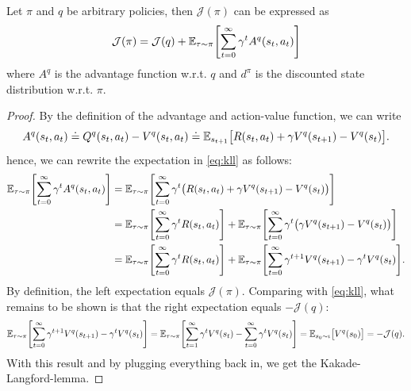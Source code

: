 		\begin{theorem}  \label{th:kll}
			Let \(\pi\) and \(q\) be arbitrary policies, then \(\mathcal{J}(\pi)\) can be expressed as
			\begin{equation}
				\mathcal{J}(\pi) = \mathcal{J}(q) + \mathbb{E}_{\tau \sim \pi}\Biggl[ \sum_{t = 0}^{\infty} \gamma^t A^q(s_t, a_t) \Biggr]  \label{eq:kll}
			\end{equation}
			where \( A^q \) is the advantage function w.r.t. \(q\) and \(d^\pi\) is the discounted state distribution w.r.t. \(\pi\).
		\end{theorem}
		\begin{proof}
			By the definition of the advantage and action-value function, we can write
			\begin{equation}
				A^q(s_t, a_t)
					\doteq Q^q(s_t, a_t) - V^q(s_t, a_t)
					\doteq \mathbb{E}_{s_{t + 1}}\bigl[ R(s_t, a_t) + \gamma V^q(s_{t + 1}) - V^q(s_t) \bigr].
			\end{equation}
			hence, we can rewrite the expectation in \eqref{eq:kll} as follows:
			\begin{align}
				\mathbb{E}_{\tau \sim \pi}\Biggl[ \sum_{t = 0}^{\infty} \gamma^t A^q(s_t, a_t) \Biggr]
					&= \mathbb{E}_{\tau \sim \pi}\Biggl[ \sum_{t = 0}^{\infty} \gamma^t \bigl( R(s_t, a_t) + \gamma V^q(s_{t + 1}) - V^q(s_t) \bigr) \Biggr] \\
					&= \mathbb{E}_{\tau \sim \pi}\Biggl[ \sum_{t = 0}^{\infty} \gamma^t R(s_t, a_t) \Biggr] + \mathbb{E}_{\tau \sim \pi}\Biggl[ \sum_{t = 0}^{\infty} \gamma^t \bigl( \gamma V^q(s_{t + 1}) - V^q(s_t) \bigr) \Biggr] \\
					&= \mathbb{E}_{\tau \sim \pi}\Biggl[ \sum_{t = 0}^{\infty} \gamma^t R(s_t, a_t) \Biggr] + \mathbb{E}_{\tau \sim \pi}\Biggl[ \sum_{t = 0}^{\infty} \gamma^{t + 1} V^q(s_{t + 1}) - \gamma^t V^q(s_t) \Biggr].
			\end{align}
			By definition, the left expectation equals \( \mathcal{J}(\pi) \). Comparing with \eqref{eq:kll}, what remains to be shown is that the right expectation equals \( -\mathcal{J}(q) \):
			\begin{equation}
				\mathbb{E}_{\tau \sim \pi}\Biggl[ \sum_{t = 0}^{\infty} \gamma^{t + 1} V^q(s_{t + 1}) - \gamma^t V^q(s_t) \Biggr]
					= \mathbb{E}_{\tau \sim \pi}\Biggl[ \sum_{t = 1}^{\infty} \gamma^t V^q(s_t) - \sum_{t = 0}^{\infty} \gamma^t V^q(s_t) \Biggr]
					= \mathbb{E}_{s_0 \sim \iota}\bigl[ V^q(s_0) \bigr]
					= -\mathcal{J}(q).
			\end{equation}
			With this result and by plugging everything back in, we get the Kakade-Langford-lemma.
		\end{proof}

